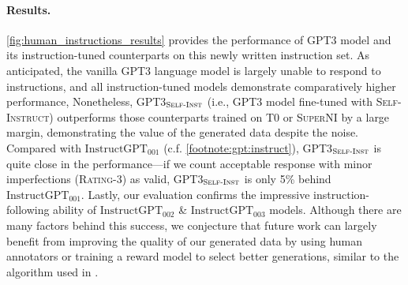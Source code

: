 \documentclass[11pt]{article}
\newcommand{\nascomment}[1]{\textcolor{blue}{\textbf{[#1 -- \textsc{nas}]}}}
\newcommand{\alisa}[1]{\textcolor{purple}{\textbf{[#1 -- \textsc{al}]}}}
\newcommand{\name}{\textsc{Self-Instruct}}
\newcommand{\supernatShort}{\textsc{SuperNI}}
\newcommand{\tzero}{\textsc{T$0$}}
\newcommand{\gptthree}{\textsc{GPT3}}
\newcommand{\gptself}{\textsc{GPT3}$_{\textsc{Self-Inst}}$}
\newcommand{\gptinstruct}[1]{$\text{InstructGPT}_{\text{#1}}$}
\begin{document}
\paragraph{Results.}
\autoref{fig:human_instructions_results} provides the performance of \gptthree{} model and its instruction-tuned counterparts on this newly written instruction set. As anticipated, the vanilla \gptthree{} language model is largely unable to respond to instructions, and all instruction-tuned models demonstrate comparatively higher performance, 
Nonetheless, \gptself{} (i.e.,  \gptthree{} model fine-tuned with \name) outperforms those counterparts trained on \tzero{} or \supernatShort{} by a large margin, demonstrating the value of the generated data despite the noise. 
Compared with \gptinstruct{001} (c.f. \autoref{footnote:gpt:instruct}), \gptself{} is quite close in the performance---if we count acceptable response with minor imperfections (\textsc{Rating-3}) as valid, \gptself{} is only 5\% behind \gptinstruct{001}. Lastly, our evaluation confirms the impressive instruction-following ability of \gptinstruct{002} \& \gptinstruct{003} models. Although there are many factors behind this success, we conjecture that future work can largely benefit from improving the quality of our generated data by using human annotators or training a reward model to select better generations, similar to the algorithm used in \citet{ouyang2022training}.


\end{document}
